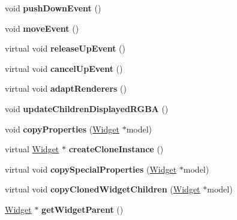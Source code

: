 \begin{DoxyCompactItemize}
void {\bfseries push\+Down\+Event} ()
\item 
\mbox{\label{classui_1_1Widget_a1e2054502be048aa93dd2a866afa1052}} 
void {\bfseries move\+Event} ()
\item 
\mbox{\label{classui_1_1Widget_ae138dc079f9d6965706e508af84bc688}} 
virtual void {\bfseries release\+Up\+Event} ()
\item 
\mbox{\label{classui_1_1Widget_ad1977425689ff8203d212db920948ecd}} 
virtual void {\bfseries cancel\+Up\+Event} ()
\item 
\mbox{\label{classui_1_1Widget_ad3d2b50ab43fede58010c11e0e25ab97}} 
virtual void {\bfseries adapt\+Renderers} ()
\item 
\mbox{\label{classui_1_1Widget_a688b678d37e87f6c3dc03d2116560e5b}} 
void {\bfseries update\+Children\+Displayed\+R\+G\+BA} ()
\item 
\mbox{\label{classui_1_1Widget_a8b92894d6778cb233b34db2f26714f3b}} 
void {\bfseries copy\+Properties} (\hyperlink{classui_1_1Widget}{Widget} $\ast$model)
\item 
\mbox{\label{classui_1_1Widget_a19163d5d528fcc08bc70c19ce3fcf96e}} 
virtual \hyperlink{classui_1_1Widget}{Widget} $\ast$ {\bfseries create\+Clone\+Instance} ()
\item 
\mbox{\label{classui_1_1Widget_acffaef24fd46f61e70123b75841282fd}} 
virtual void {\bfseries copy\+Special\+Properties} (\hyperlink{classui_1_1Widget}{Widget} $\ast$model)
\item 
\mbox{\label{classui_1_1Widget_af086391cb77c6625d366a52e1aab95a5}} 
virtual void {\bfseries copy\+Cloned\+Widget\+Children} (\hyperlink{classui_1_1Widget}{Widget} $\ast$model)
\item 
\mbox{\label{classui_1_1Widget_a4a1bc3d4e10e0766aef35a7f2e2371b4}} 
\hyperlink{classui_1_1Widget}{Widget} $\ast$ {\bfseries get\+Widget\+Parent} ()
\item 
\mbox{\label{classui_1_1Widget_ab06443178cbc5802e7cd329bc553332c}} 

\end{DoxyCompactItemize}
